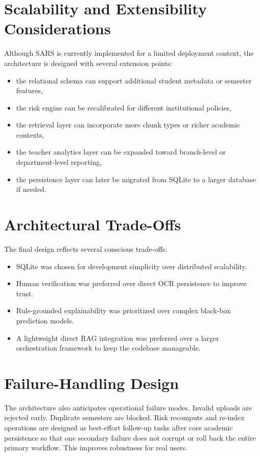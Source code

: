 \section{Scalability and Extensibility Considerations}
Although SARS is currently implemented for a limited deployment context, the architecture is designed with several extension points:
\begin{itemize}[leftmargin=*]
\item the relational schema can support additional student metadata or semester features,
\item the risk engine can be recalibrated for different institutional policies,
\item the retrieval layer can incorporate more chunk types or richer academic contexts,
\item the teacher analytics layer can be expanded toward branch-level or department-level reporting,
\item the persistence layer can later be migrated from SQLite to a larger database if needed.
\end{itemize}

\section{Architectural Trade-Offs}
The final design reflects several conscious trade-offs:
\begin{itemize}[leftmargin=*]
\item SQLite was chosen for development simplicity over distributed scalability.
\item Human verification was preferred over direct OCR persistence to improve trust.
\item Rule-grounded explainability was prioritized over complex black-box prediction models.
\item A lightweight direct RAG integration was preferred over a larger orchestration framework to keep the codebase manageable.
\end{itemize}

\section{Failure-Handling Design}
The architecture also anticipates operational failure modes. Invalid uploads are rejected early. Duplicate semesters are blocked. Risk recompute and re-index operations are designed as best-effort follow-up tasks after core academic persistence so that one secondary failure does not corrupt or roll back the entire primary workflow. This improves robustness for real users.


